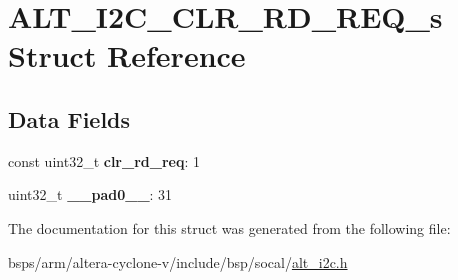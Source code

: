 \hypertarget{structALT__I2C__CLR__RD__REQ__s}{}\section{A\+L\+T\+\_\+\+I2\+C\+\_\+\+C\+L\+R\+\_\+\+R\+D\+\_\+\+R\+E\+Q\+\_\+s Struct Reference}
\label{structALT__I2C__CLR__RD__REQ__s}
\subsection*{Data Fields}
\begin{DoxyCompactItemize}
\item 
\mbox{\label{structALT__I2C__CLR__RD__REQ__s_a4a44b2b70f0481c556bd5be0fb3dd4de}} 
const uint32\+\_\+t {\bfseries clr\+\_\+rd\+\_\+req}\+: 1
\item 
\mbox{\label{structALT__I2C__CLR__RD__REQ__s_a192d4101286e478ed1195996dd7417a7}} 
uint32\+\_\+t {\bfseries \+\_\+\+\_\+pad0\+\_\+\+\_\+}\+: 31
\end{DoxyCompactItemize}


The documentation for this struct was generated from the following file\+:\begin{DoxyCompactItemize}
\item 
bsps/arm/altera-\/cyclone-\/v/include/bsp/socal/\mbox{\hyperlink{socal_2alt__i2c_8h}{alt\+\_\+i2c.\+h}}\end{DoxyCompactItemize}

